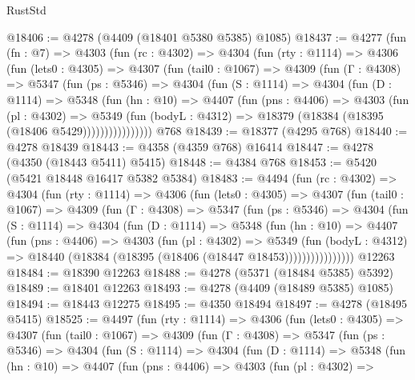 \begin{lexlean}{RustStd}
\begin{coremodule}
{\begin{coremodule}
{{{{{{{{{{{{{{{{{{{{{{{{{{{{{{{{{{{@18406 := @4278 (@4409 (@18401 @5380 @5385) @1085)
@18437 := @4277
    (fun (fn : @7) =>
    @4303
      (fun (rc : @4302) =>
      @4304
        (fun (rty : @1114) =>
        @4306
          (fun (lets0 : @4305) =>
          @4307
            (fun (tail0 : @1067) =>
            @4309
              (fun (Γ : @4308) =>
              @5347
                (fun (ps : @5346) =>
                @4304
                  (fun (S : @1114) =>
                  @4304
                    (fun (D : @1114) =>
                    @5348
                      (fun (hn : @10) =>
                      @4407
                        (fun (pns : @4406) =>
                        @4303
                          (fun (pl : @4302) =>
                          @5349
                            (fun (bodyL : @4312) =>
                            @18379 (@18384 (@18395 (@18406 @5429))))))))))))))))
    @768
@18439 := @18377 (@4295 @768)
@18440 := @4278 @18439
@18443 := @4358 (@4359 @768) @16414
@18447 := @4278 (@4350 (@18443 @5411) @5415)
@18448 := @4384 @768
@18453 := @5420 (@5421 @18448 @16417 @5382 @5384)
@18483 := @4494
    (fun (rc : @4302) =>
    @4304
      (fun (rty : @1114) =>
      @4306
        (fun (lets0 : @4305) =>
        @4307
          (fun (tail0 : @1067) =>
          @4309
            (fun (Γ : @4308) =>
            @5347
              (fun (ps : @5346) =>
              @4304
                (fun (S : @1114) =>
                @4304
                  (fun (D : @1114) =>
                  @5348
                    (fun (hn : @10) =>
                    @4407
                      (fun (pns : @4406) =>
                      @4303
                        (fun (pl : @4302) =>
                        @5349
                          (fun (bodyL : @4312) =>
                          @18440 (@18384 (@18395 (@18406 (@18447 @18453))))))))))))))))
    @12263
@18484 := @18390 @12263
@18488 := @4278 (@5371 (@18484 @5385) @5392)
@18489 := @18401 @12263
@18493 := @4278 (@4409 (@18489 @5385) @1085)
@18494 := @18443 @12275
@18495 := @4350 @18494
@18497 := @4278 (@18495 @5415)
@18525 := @4497
    (fun (rty : @1114) =>
    @4306
      (fun (lets0 : @4305) =>
      @4307
        (fun (tail0 : @1067) =>
        @4309
          (fun (Γ : @4308) =>
          @5347
            (fun (ps : @5346) =>
            @4304
              (fun (S : @1114) =>
              @4304
                (fun (D : @1114) =>
                @5348
                  (fun (hn : @10) =>
                  @4407
                    (fun (pns : @4406) =>
                    @4303
                      (fun (pl : @4302) =>
}}}}}}}}}}}}}}}}}}}}}}}}}}}}}}}}}}}
\end{coremodule}}
\end{coremodule}
\end{lexlean}
